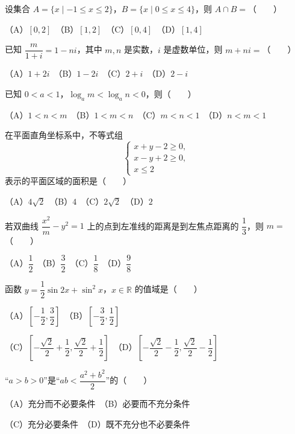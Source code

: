 \begin{question}
设集合 $A=\{x\mid -1\leqslant x\leqslant2\}$，$B=\{x\mid 0\leqslant x\leqslant4\}$，则 $A\cap B=$\mbox{（　　）}

（A）$[0,2]$　（B）$[1,2]$　（C）$[0,4]$　（D）$[1,4]$

\end{question}
\begin{question}
已知 $\dfrac{m}{1+i}=1-ni$，其中 $m,n$ 是实数，$i$ 是虚数单位，则 $m+ni=$\mbox{（　　）}

（A）$1+2i$　（B）$1-2i$　（C）$2+i$　（D）$2-i$

\end{question}
\begin{question}
已知 $0<a<1$，$\log_a m<\log_a n<0$，则\mbox{（　　）}

（A）$1<n<m$　（B）$1<m<n$　（C）$m<n<1$　（D）$n<m<1$

\end{question}
\begin{question}
在平面直角坐标系中，不等式组
\nopagebreak[4]
\[
\begin{cases}
x+y-2\geqslant0,\\
x-y+2\geqslant0,\\
x\leqslant2
\end{cases}
\]
表示的平面区域的面积是\mbox{（　　）}

（A）$4\sqrt2$　（B）$4$　（C）$2\sqrt2$　（D）$2$

\end{question}
\begin{question}
若双曲线 $\dfrac{x^2}{m}-y^2=1$ 上的点到左准线的距离是到左焦点距离的 $\dfrac13$，则 $m=$\mbox{（　　）}

（A）$\dfrac12$　（B）$\dfrac32$　（C）$\dfrac18$　（D）$\dfrac98$

\end{question}
\begin{question}
函数 $y=\dfrac12\sin2x+\sin^2x$，$x\in\mathbb R$ 的值域是\mbox{（　　）}

（A）$\left[-\dfrac12,\dfrac32\right]$　（B）$\left[-\dfrac32,\dfrac12\right]$

（C）$\left[-\dfrac{\sqrt2}{2}+\dfrac12,\dfrac{\sqrt2}{2}+\dfrac12\right]$　（D）$\left[-\dfrac{\sqrt2}{2}-\dfrac12,\dfrac{\sqrt2}{2}-\dfrac12\right]$

\end{question}
\begin{question}
“$a>b>0$”是“$ab<\dfrac{a^2+b^2}{2}$”的\mbox{（　　）}

（A）充分而不必要条件　（B）必要而不充分条件

（C）充分必要条件　（D）既不充分也不必要条件

\end{question}
